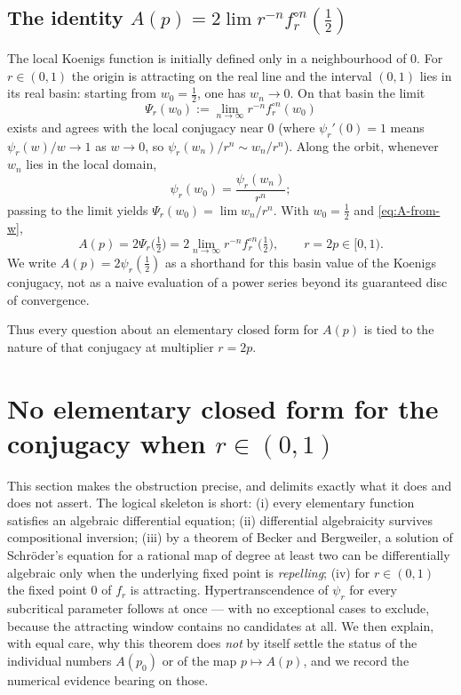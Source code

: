\documentclass[11pt,a4paper]{article}
\theoremstyle{plain}
\theoremstyle{definition}
\begin{document}
\subsection{The identity $A(p)=2\lim r^{-n}f_r^{\circ n}(\tfrac12)$}

The local Koenigs function is initially defined only in a neighbourhood of $0$. For $r\in(0,1)$ the origin is attracting on the real line and the interval $(0,1)$ lies in its real basin: starting from $w_0=\tfrac12$, one has $w_n\to0$. On that basin the limit
\begin{equation}
\label{eq:basin-koenigs}
\Psi_r(w_0)
:=
\lim_{n\to\infty} r^{-n} f_r^{\circ n}(w_0)
\end{equation}
exists and agrees with the local conjugacy near $0$ (where $\psi_r'(0)=1$ means $\psi_r(w)/w\to1$ as $w\to0$, so $\psi_r(w_n)/r^n\sim w_n/r^n$). Along the orbit, whenever $w_n$ lies in the local domain,
\[
\psi_r(w_0)=\frac{\psi_r(w_n)}{r^n};
\]
passing to the limit yields $\Psi_r(w_0)=\lim w_n/r^n$. With $w_0=\tfrac12$ and \eqref{eq:A-from-w},
\begin{equation}
\label{eq:A-koenigs}
A(p)
=
2\Psi_r\bigl(\tfrac12\bigr)
=
2\lim_{n\to\infty} r^{-n} f_r^{\circ n}\bigl(\tfrac12\bigr),
\qquad r=2p\in[0,1).
\end{equation}
We write $A(p)=2\psi_r(\tfrac12)$ as a shorthand for this basin value of the Koenigs conjugacy, not as a naive evaluation of a power series beyond its guaranteed disc of convergence.

Thus every question about an elementary closed form for $A(p)$ is tied to the nature of that conjugacy at multiplier $r=2p$.

\section{No elementary closed form for the conjugacy when $r\in(0,1)$}
\label{sec:ncf-main}

This section makes the obstruction precise, and delimits exactly what it does and does not assert. The logical skeleton is short:
(i) every elementary function satisfies an algebraic differential equation;
(ii) differential algebraicity survives compositional inversion;
(iii) by a theorem of Becker and Bergweiler, a solution of Schr\"oder's equation for a rational map of degree at least two can be differentially algebraic only when the underlying fixed point is \emph{repelling};
(iv) for $r\in(0,1)$ the fixed point $0$ of $f_r$ is attracting.
Hypertranscendence of $\psi_r$ for every subcritical parameter follows at once --- with no exceptional cases to exclude, because the attracting window contains no candidates at all. We then explain, with equal care, why this theorem does \emph{not} by itself settle the status of the individual numbers $A(p_0)$ or of the map $p\mapsto A(p)$, and we record the numerical evidence bearing on those.
\end{document}
